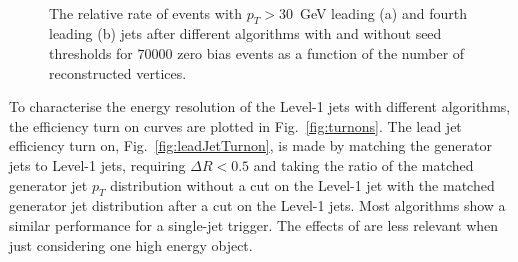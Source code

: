 \begin{figure}
  \centering
  ~ 
  \caption{The relative rate of events with $p_T>30$~GeV leading (a)
  and fourth leading (b) jets after different \PUS algorithms with and
  without seed thresholds for $70 000$ zero bias events as a function
  of the number of reconstructed vertices.}
  \label{fig:ratenvtx}
\end{figure}

To characterise the energy resolution of the Level-1 jets with
different \PUS algorithms, the efficiency turn on curves are plotted
in Fig.~\ref{fig:turnons}. The lead jet efficiency turn on,
Fig.~\ref{fig:leadJetTurnon}, is
made by matching the generator jets to Level-1 jets, requiring $\Delta
R<0.5$ and taking the ratio of the matched generator jet $p_T$
distribution without a cut on the Level-1 jet with the matched
generator jet distribution after a cut on the Level-1 jets. Most algorithms
show a similar performance for a single-jet trigger. The effects of
\PU are less relevant when just considering one high energy object.

